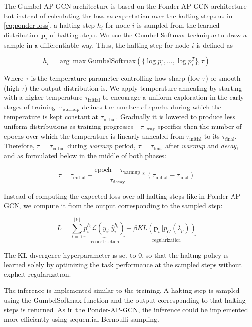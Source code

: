 \documentclass{gdl}
\begin{document}
The Gumbel-AP-GCN architecture is based on the Ponder-AP-GCN architecture but instead of calculating the loss as expectation over the halting steps as in \autoref{eq:ponder-loss}, a halting step $h_i$ for node $i$ is sampled from the learned distribution $\mathbf{p}_i$ of halting steps. We use the Gumbel-Softmax technique \cite{Maddison2017, Jang2017} to draw a sample in a differentiable way. Thus, the halting step for node $i$ is defined as

$$
    h_i = \arg\max \text{GumbelSoftmax}(\{\log p_i^1,...,\log p_i^{T}\}, \tau)
$$

\noindent Where $\tau$ is the temperature parameter controlling how sharp (low $\tau$) or smooth (high $\tau$) the output distribution is. We apply temperature annealing by starting with a higher temperature $\tau_{\text{initial}}$ to encourage a uniform exploration in the early stages of training. $\tau_{\text{warmup}}$ defines the number of epochs during which the temperature is kept constant at $\tau_{\text{initial}}$. Gradually it is lowered to produce less uniform distributions as training progresses - $\tau_{\text{decay}}$ specifies then the number of epochs over which the temperature is linearly annealed from $\tau_{\text{initial}}$ to its $\tau_{\text{final}}$.
Therefore, $\tau$ = $\tau_{\text{initial}}$ during \textit{warmup} period, $\tau$ = $\tau_{\text{final}}$ after \textit{warmup} and \textit{decay}, and as formulated below in the middle of both phases:

$$
\tau = \tau_{\text{initial}} - \frac{\text{epoch} - \tau_{\text{warmup}}}{\tau_{\text{decay}}}  * (\tau_{\text{initial}} - \tau_{\text{final}})
$$

Instead of computing the expected loss over all halting steps like in Ponder-AP-GCN, we compute it from the output corresponding to the sampled step:

$$
L = \sum_{i=1}^{\mathcal{|V|}} \underbrace{p_i^{h_i} \mathcal{L}(y_i, \hat{y}_i^{h_i})}_{\text{reconstruction}} + \beta \underbrace{KL(\mathbf{p}_i || p_G(\lambda_p))}_{\text{regularization}}
$$

\noindent The KL divergence hyperparameter is set to 0, so that the halting policy is learned solely by optimizing the task performance at the sampled steps without explicit regularization. 

The inference is implemented similar to the training. A halting step is sampled using the GumbelSoftmax function and the output corresponding to that halting steps is returned. As in the Ponder-AP-GCN, the inference could be implemented more efficiently using sequential Bernoulli sampling.
\end{document}
